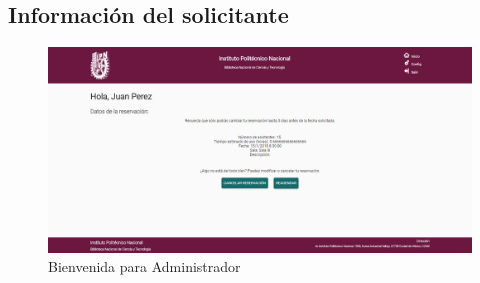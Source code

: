 \subsection{Información del solicitante}
\begin{figure}[hbtp]
		\centering
		\includegraphics[scale=0.3]{images/Interfaz/IUGS00_binevenida.png}
		\caption{Bienvenida para Administrador}
	\end{figure}


